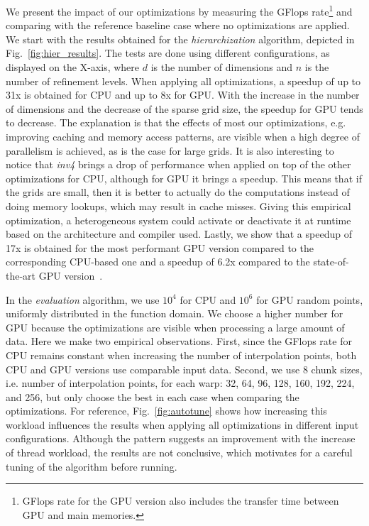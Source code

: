 We present the impact of our optimizations by measuring the GFlops
rate\footnote{GFlops rate for the GPU version also includes the transfer time
between GPU and main memories.} and comparing with the reference baseline case
where no optimizations are applied. We start with the results obtained for the
\textit{hierarchization} algorithm, depicted in Fig.~\ref{fig:hier_results}. The
tests are done using different configurations, as displayed on the X-axis, where
$d$ is the number of dimensions and $n$ is the number of refinement levels. When
applying all optimizations, a speedup of up to 31x is obtained for CPU and up to
8x for GPU. With the increase in the number of dimensions and the decrease of
the sparse grid size, the speedup for GPU tends to decrease. The explanation is
that the effects of most our optimizations, e.g. improving caching and memory
access patterns, are visible when a high degree of parallelism is achieved, as
is the case for large grids. It is also interesting to notice that \textit{inv4}
brings a drop of performance when applied on top of the other optimizations for
CPU, although for GPU it brings a speedup. This means that if the grids are
small, then it is better to actually do the computations instead of doing memory
lookups, which may result in cache misses. Giving this empirical optimization, a
heterogeneous system could activate or deactivate it at runtime based on the
architecture and compiler used. Lastly, we show that a speedup of 17x is
obtained for the most performant GPU version compared to the corresponding
CPU-based one and a speedup of 6.2x compared to the state-of-the-art GPU
version~\cite{Murarasu:2011:CDS:1941553.1941559}.

In the \textit{evaluation} algorithm, we use $10^{4}$ for CPU and $10^{6}$
for GPU random points, uniformly distributed in the function domain. We
choose a higher number for GPU because the optimizations are visible when
processing a large amount of data. Here we make two empirical observations.
First, since the GFlops rate for CPU remains constant when increasing the number
of interpolation points, both CPU and GPU versions use comparable input data.
Second, we use 8 chunk sizes, i.e. number of interpolation points, for each
warp: 32, 64, 96, 128, 160, 192, 224, and 256, but only choose the best in each
case when comparing the optimizations. For reference, Fig.~\ref{fig:autotune}
shows how increasing this workload influences the results when applying all
optimizations in different input configurations. Although the pattern suggests
an improvement with the increase of thread workload, the results are not
conclusive, which motivates for a careful tuning of the algorithm before
running.


